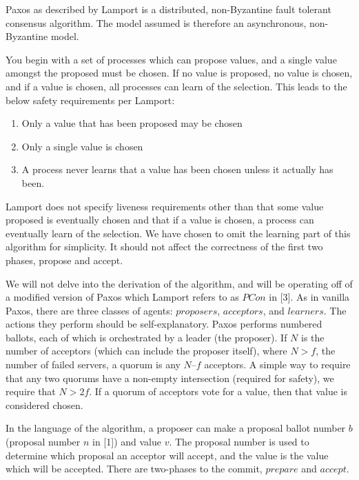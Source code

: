 \documentclass[conference]{IEEEtran}
\begin{document}
Paxos as described by Lamport is a distributed, non-Byzantine fault tolerant consensus algorithm. The model assumed is therefore an asynchronous, non-Byzantine model.

You begin with a set of processes which can propose values, and a single value amongst the proposed must be chosen. If no value is proposed, no value is chosen, and if a value is chosen, all processes can learn of the selection. This leads to the below safety requirements per Lamport:
\smallskip
\begin{enumerate}
\item Only a value that has been proposed may be chosen
\item Only a single value is chosen
\item A process never learns that a value has been chosen unless it actually has been.
\end{enumerate}
\smallskip

Lamport does not specify liveness requirements other than that some value proposed is eventually chosen and that if a value is chosen, a process can eventually learn of the selection. We have chosen to omit the learning part of this algorithm for simplicity. It should not affect the correctness of the first two phases, propose and accept.

We will not delve into the derivation of the algorithm, and will be operating off of a modified version of Paxos which Lamport refers to as $PCon$ in [3]. As in vanilla Paxos, there are three classes of agents: $proposers$, $acceptors$, and $learners$. The actions they perform should be self-explanatory. Paxos performs numbered ballots, each of which is orchestrated by a leader (the proposer). If $N$ is the number of acceptors (which can include the proposer itself), where $N > f$, the number of failed servers, a quorum is any $N – f$ acceptors. A simple way to require that any two quorums have a non-empty intersection (required for safety), we require that $N > 2f$. If a quorum of acceptors vote for a value, then that value is considered chosen.

In the language of the algorithm, a proposer can make a proposal ballot number $b$ (proposal number $n$ in [1]) and value $v$. The proposal number is used to determine which proposal an acceptor will accept, and the value is the value which will be accepted. There are two-phases to the commit, $prepare$ and $accept$.
\end{document}
